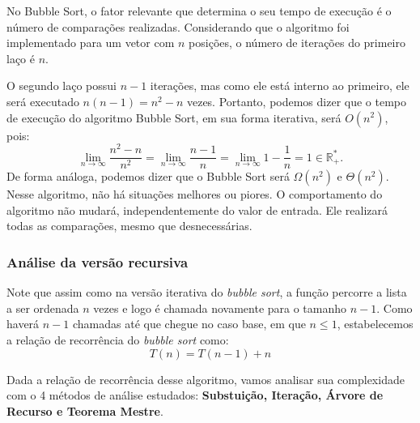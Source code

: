 No Bubble Sort, o fator relevante que determina o seu tempo de execução é o número de comparações realizadas. Considerando que o algoritmo foi implementado para um vetor com \( n \) posições, o número de iterações do primeiro laço é \( n \).

O segundo laço possui \( n-1 \) iterações, mas como ele está interno ao primeiro, ele será executado \( n(n-1) = n^2 - n \) vezes. Portanto, podemos dizer que o tempo de execução do algoritmo Bubble Sort, em sua forma iterativa, será \( O(n^2) \), pois:
\[
	\lim_{n \rightarrow \infty} \frac{n^2 - n}{n^2} =
	\lim_{n \rightarrow \infty} \frac{n - 1}{n} =
	\lim_{n \rightarrow \infty} 1-\frac{1}{n} =
	1 \in \mathbb{R}^*_+.
\]
\indent De forma análoga, podemos dizer que o Bubble Sort será \( \Omega(n^2) \) e \( \Theta(n^2) \). Nesse algoritmo, não há situações melhores ou piores. O comportamento do algoritmo não mudará, independentemente do valor de entrada. Ele realizará todas as comparações, mesmo que desnecessárias.


\subsubsection{Análise da versão recursiva}
Note que assim como na versão iterativa do \textit{bubble sort}, a função percorre a lista a ser ordenada $n$ vezes e logo é chamada novamente para o tamanho $n - 1$. Como haverá $n - 1$ chamadas até que chegue no caso base, em que $n \leq 1$, estabelecemos a relação de recorrência do \textit{bubble sort} como:
$$
	T(n) = T(n - 1) + n
$$

\indent Dada a relação de recorrência desse algoritmo, vamos analisar sua complexidade com o 4 métodos de análise estudados: \textbf{Substuição, Iteração, Árvore de Recurso e Teorema Mestre}.

